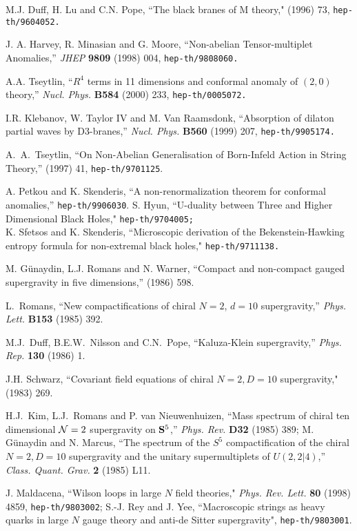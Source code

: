 \begin{thebibliography}{99}
 M.J. Duff, H. Lu  and C.N. Pope,
``The black branes of M theory,"
 (1996) 73, {\tt  hep-th/9604052.}

J. A. Harvey, R. Minasian and G. Moore,
``Non-abelian Tensor-multiplet Anomalies,''
{\em JHEP} {\bf 9809} (1998) 004, 
{\tt  hep-th/9808060.}

A.A. Tseytlin,
``$R^4$ terms in 11 dimensions and conformal anomaly of $(2,0)$ theory,''
{\em Nucl. Phys.} {\bf B584} (2000) 233,
{\tt  hep-th/0005072.}

I.R. Klebanov, W. Taylor IV and M. Van Raamsdonk,
``Absorption of dilaton partial waves by D3-branes,''
{\em Nucl. Phys.} {\bf B560} (1999) 207,
{\tt hep-th/9905174.}

A.\ A.\ Tseytlin, ``On Non-Abelian Generalisation of Born-Infeld Action
in
  String Theory,''  (1997) 41, {\tt hep-th/9701125}.

A. Petkou and K. Skenderis, ``A non-renormalization theorem for
conformal anomalies,'' {\tt hep-th/9906030}.
S. Hyun,
``U-duality between Three and Higher Dimensional
Black Holes,"
{\tt hep-th/9704005;} \\
 K. Sfetsos  and  K. Skenderis, 
``Microscopic derivation  of the  Bekenstein-Hawking
entropy formula for non-extremal black holes,"
{\tt hep-th/9711138.}

M. G\" unaydin, L.J. Romans and N. Warner, ``Compact and non-compact
gauged supergravity in five dimensions,''
 (1986) 598.

L.~Romans, ``New compactifications of chiral $N=2$, $d=10$
supergravity,'' {\em Phys. Lett.} {\bf B153} (1985) 392.

M.J.~Duff, B.E.W.~Nilsson and C.N.~Pope, ``Kaluza-Klein
supergravity,'' {\em Phys. Rep.} {\bf 130} (1986) 1.

J.H. Schwarz, ``Covariant field equations of chiral $N=2, 
D=10$ supergravity,"
 (1983) 269.

H.J.~Kim, L.J.~Romans and P. van Nieuwenhuizen,
``Mass spectrum of chiral ten dimensional ${\cal N}=2$
supergravity on ${\bf S}^5$,'' {\em Phys. Rev.} {\bf D32} (1985) 389;
M. G\" unaydin and N. Marcus,
``The spectrum of the $S^5$ compactification of the chiral 
$N=2, D = 10$ supergravity and the unitary
supermultiplets of $U(2, 2|4)$,''
{\em Class. Quant. Grav.} {\bf 2} (1985) L11.

J. Maldacena, ``Wilson loops in large $N$
 field theories," {\it Phys. Rev. Lett.} {\bf 80} (1998) 4859,
 {\tt hep-th/9803002};
S.-J. Rey and J. Yee, ``Macroscopic strings as heavy quarks 
in large $N$ gauge theory and anti-de Sitter supergravity",
{\tt hep-th/9803001}.


\end{thebibliography}
